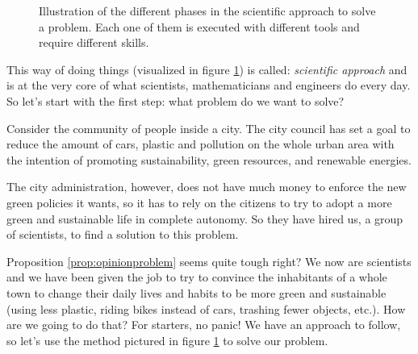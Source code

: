 %
\begin{figure}[b]
\centering
\sidecaption

%
%
\caption{Illustration of the different phases in the scientific approach to solve a problem.
Each one of them is executed with different tools and require different skills.}
\label{fig:sciappr}
\end{figure}
%

This way of doing things (visualized in figure \ref{fig:sciappr})
is called: \textit{scientific approach} and is at the very core
of what scientists, mathematicians and engineers do every day. So let's start
with the first step: what problem do we want to solve?

\begin{proposition}
\label{prop:opinionproblem}
Consider the community of people inside a city. The city council has set a goal to reduce
the amount of cars, plastic and pollution on the whole urban area with the intention of
promoting sustainability, green resources, and renewable energies.

The city administration, however, does not have much money to enforce the new green policies
it wants, so it has to rely on the citizens to try to adopt a more green and sustainable life
in complete autonomy. So they have hired us, a group of scientists, to find a solution to
this problem.
\end{proposition}

Proposition \ref{prop:opinionproblem} seems quite tough right? We now are scientists and we
have been given the job to try to convince the inhabitants of a whole town to change their
daily lives and habits to be more green and sustainable (using less plastic, riding bikes instead of
cars, trashing fewer objects, etc.). How are we going to do that?
For starters, no panic! We have an approach to follow, so let's use the method pictured in figure
\ref{fig:sciappr} to solve our problem.\\

